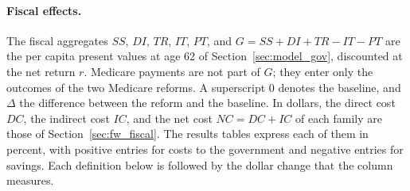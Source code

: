 \paragraph{Fiscal effects.} The fiscal aggregates $\mathit{SS}$, $\mathit{DI}$, $\mathit{TR}$, $\mathit{IT}$, $\mathit{PT}$, and $G=\mathit{SS}+\mathit{DI}+\mathit{TR}-\mathit{IT}-\mathit{PT}$ are the per capita present values at age 62 of Section~\ref{sec:model_gov}, discounted at the net return $r$. Medicare payments are not part of $G$; they enter only the outcomes of the two Medicare reforms. A superscript 0 denotes the baseline, and $\Delta$ the difference between the reform and the baseline. In dollars, the direct cost $\mathit{DC}$, the indirect cost $\mathit{IC}$, and the net cost $\mathit{NC}=\mathit{DC}+\mathit{IC}$ of each family are those of Section~\ref{sec:fw_fiscal}. The results tables express each of them in percent, with positive entries for costs to the government and negative entries for savings. Each definition below is followed by the dollar change that the column measures.
